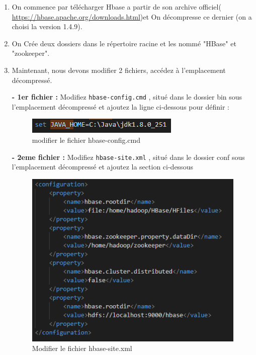 \begin{enumerate}

\item On commence par télécharger Hbase a partir de son archive officiel( \url{https://hbase.apache.org/downloads.html})et On décompresse ce dernier (on a choisi la version 1.4.9).

\item On Crée deux dossiers dans le répertoire racine et les nommé "HBase" et "zookeeper".

\item Maintenant, nous devons modifier 2 fichiers, accédez à l'emplacement décompressé.

\textbf{- 1er fichier :} Modifiez \texttt{hbase-config.cmd} , situé dans le dossier bin sous l'emplacement décompressé et ajoutez la ligne ci-dessous pour définir :
\begin{figure}[h]
	\centering
    \includegraphics[scale=0.6]{img/part3/2.2}
    \caption{modifier le fichier hbase-config.cmd}
\end{figure}

\textbf{- 2eme fichier :} Modifiez \texttt{hbase-site.xml} , situé dans le dossier conf sous l'emplacement décompressé et ajoutez la section ci-dessous
\begin{figure}[h]
	\centering
    \includegraphics[scale=0.4]{img/part3/2.3}
    \caption{Modifier le fichier hbase-site.xml}
\end{figure}

\end{enumerate}










